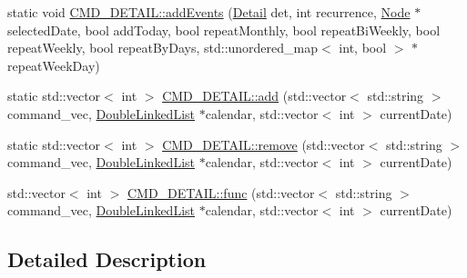 \begin{DoxyCompactItemize}
\item 
static void \hyperlink{group__CMD__DETAIL_ga80f84e2810faa505dc48fcc8832ead6c}{C\-M\-D\-\_\-\-D\-E\-T\-A\-I\-L\-::add\-Events} (\hyperlink{classDetail}{Detail} det, int recurrence, \hyperlink{classNode}{Node} $\ast$selected\-Date, bool add\-Today, bool repeat\-Monthly, bool repeat\-Bi\-Weekly, bool repeat\-Weekly, bool repeat\-By\-Days, std\-::unordered\-\_\-map$<$ int, bool $>$ $\ast$repeat\-Week\-Day)
\item 
static std\-::vector$<$ int $>$ \hyperlink{group__CMD__DETAIL_ga0b49c27571f2cb14fe28d9267ac5d1d0}{C\-M\-D\-\_\-\-D\-E\-T\-A\-I\-L\-::add} (std\-::vector$<$ std\-::string $>$ command\-\_\-vec, \hyperlink{classDoubleLinkedList}{Double\-Linked\-List} $\ast$calendar, std\-::vector$<$ int $>$ current\-Date)
\item 
static std\-::vector$<$ int $>$ \hyperlink{group__CMD__DETAIL_gab77ee0d754003aa6a1f3c0aa301962b8}{C\-M\-D\-\_\-\-D\-E\-T\-A\-I\-L\-::remove} (std\-::vector$<$ std\-::string $>$ command\-\_\-vec, \hyperlink{classDoubleLinkedList}{Double\-Linked\-List} $\ast$calendar, std\-::vector$<$ int $>$ current\-Date)
\item 
std\-::vector$<$ int $>$ \hyperlink{group__CMD__DETAIL_ga220b66828663d5311ad270969b6155ed}{C\-M\-D\-\_\-\-D\-E\-T\-A\-I\-L\-::func} (std\-::vector$<$ std\-::string $>$ command\-\_\-vec, \hyperlink{classDoubleLinkedList}{Double\-Linked\-List} $\ast$calendar, std\-::vector$<$ int $>$ current\-Date)
\end{DoxyCompactItemize}


\subsection{Detailed Description}


